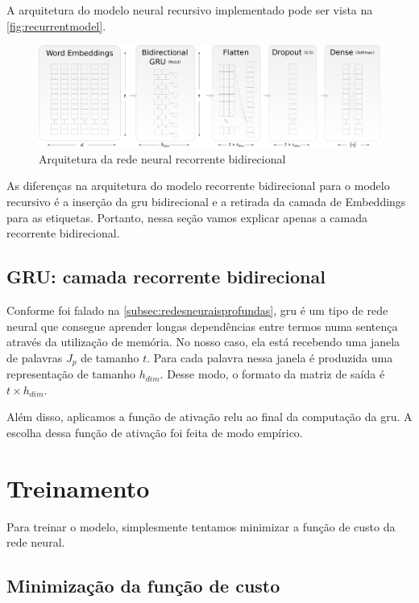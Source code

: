 A arquitetura do modelo neural recursivo implementado pode ser vista na \autoref{fig:recurrentmodel}.

\begin{figure}[!htb]
    \caption{Arquitetura da rede neural recorrente bidirecional}\label{fig:recurrentmodel}
    \begin{center}
        \includegraphics[scale=0.2]{img/recurrent_model_horizontal.pdf}
    \end{center}
\end{figure}


As diferenças na arquitetura do modelo recorrente bidirecional para o modelo recursivo é a inserção da \ac{gru} bidirecional e a retirada da camada de Embeddings para as etiquetas. Portanto, nessa seção vamos explicar apenas a camada recorrente bidirecional.

\subsection{GRU: camada recorrente bidirecional}

Conforme foi falado na \autoref{subsec:redesneuraisprofundas}, \ac{gru} é um tipo de rede neural que consegue aprender longas dependências entre termos numa sentença através da utilização de memória. No nosso caso, ela está recebendo uma janela de palavras $J_p$ de tamanho $t$. Para cada palavra nessa janela é produzida uma representação de tamanho $h_{dim}$. Desse modo, o formato da matriz de saída é $t \times h_{dim}$. 

Além disso, aplicamos a função de ativação \ac{relu} ao final da computação da \ac{gru}. A escolha dessa função de ativação foi feita de modo empírico.

\section{Treinamento}

Para treinar o modelo, simplesmente tentamos minimizar a função de custo da rede neural.

\subsection{Minimização da função de custo}


